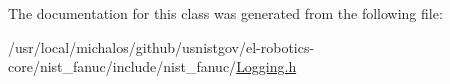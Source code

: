 The documentation for this class was generated from the following file\-:\begin{DoxyCompactItemize}
\item 
/usr/local/michalos/github/usnistgov/el-\/robotics-\/core/nist\-\_\-fanuc/include/nist\-\_\-fanuc/\hyperlink{Logging_8h}{Logging.\-h}\end{DoxyCompactItemize}
